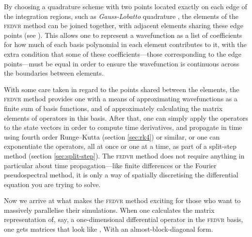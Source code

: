 By choosing a quadrature scheme with two points located exactly on each edge of the integration regions, such as \emph{Gauss-Lobatto} quadrature \cite{schneider_discrete_2005}, the elements of the \textsc{fedvr} method can be joined together, with adjacent elements sharing these edge points (see ). This allows one to represent a wavefunction as a list of coefficients for how much of each basis polynomial in each element contributes to it, with the extra condition that some of these coefficients---those corresponding to the edge points---must be equal in order to ensure the wavefunction is continuous across the boundaries between elements.

With some care taken in regard to the points shared between the elements, the \textsc{fedvr} method provides one with a means of approximating wavefunctions as a finite sum of basis functions, and of approximately calculating the matrix elements of operators in this basis. After that, one can simply apply the operators to the state vectors in order to compute time derivatives, and propagate in time using fourth order Runge--Kutta (section \ref{sec:rk4}) or similar, or one can exponentiate the operators, all at once or one at a time, as part of a split-step method (section \ref{sec:split-step}). The \textsc{fedvr} method does not require anything in particular about time propagation---like finite differences or the Fourier pseudospectral method, it is only a way of spatially discretising the differential equation you are trying to solve.

Now we arrive at what makes the \textsc{fedvr} method exciting for those who want to massively parallelise their simulations. When one calculates the matrix representation of, say, a one-dimensional differential operator in the \textsc{fedvr} basis, one gets matrices that look like , With an almost-block-diagonal form.

